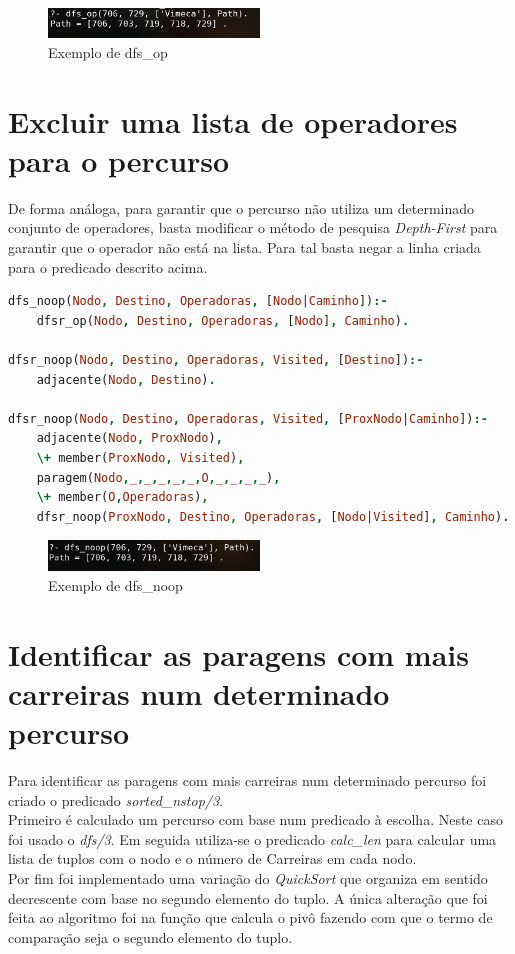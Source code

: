 \documentclass[a4paper]{report}
\begin{document}
\begin{figure}[H]
    \centering 
    \includegraphics[width=0.5\textwidth]{images/dfs_op.png}
    \caption{Exemplo de dfs\_op}
\end{figure}

\section{Excluir uma lista de operadores para o percurso}
De forma análoga, para garantir que o percurso não utiliza um determinado
conjunto de operadores, basta modificar o método de pesquisa
\textit{Depth-First} para garantir que o operador não está na lista. Para tal
basta negar a linha criada para o predicado descrito acima.\\

\begin{lstlisting}[language=Prolog]
dfs_noop(Nodo, Destino, Operadoras, [Nodo|Caminho]):-
    dfsr_op(Nodo, Destino, Operadoras, [Nodo], Caminho).

dfsr_noop(Nodo, Destino, Operadoras, Visited, [Destino]):-
    adjacente(Nodo, Destino).

dfsr_noop(Nodo, Destino, Operadoras, Visited, [ProxNodo|Caminho]):-
    adjacente(Nodo, ProxNodo),
    \+ member(ProxNodo, Visited),
    paragem(Nodo,_,_,_,_,_,O,_,_,_,_),
    \+ member(O,Operadoras),
    dfsr_noop(ProxNodo, Destino, Operadoras, [Nodo|Visited], Caminho).
\end{lstlisting}

\begin{figure}[H]
    \centering 
    \includegraphics[width=0.5\textwidth]{images/dfs_noop.png}
    \caption{Exemplo de dfs\_noop}
\end{figure}

\section{Identificar as paragens com mais carreiras num determinado percurso}
Para identificar as paragens com mais carreiras num determinado percurso foi
criado o predicado \textit{sorted\_nstop/3}.\\
Primeiro é calculado um percurso com base num predicado à escolha. Neste caso
foi usado o \textit{dfs/3}. Em seguida utiliza-se o predicado \textit{calc\_len}
para calcular uma lista de tuplos com o nodo e o número de Carreiras em cada
nodo.\\
Por fim foi implementado uma variação do \textit{QuickSort} que organiza em
sentido decrescente com base no segundo elemento do tuplo. A única alteração que
foi feita ao algoritmo foi na função que calcula o pivô fazendo com que o termo
de comparação seja o segundo elemento do tuplo.\\
\end{document}
